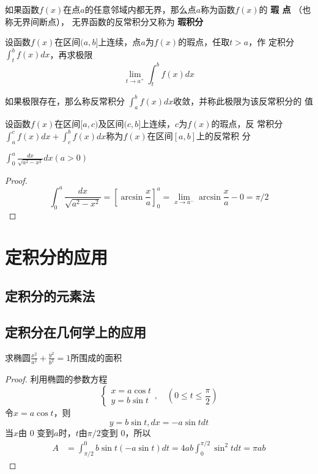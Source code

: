 \documentclass[11pt]{article}
\begin{document}
如果函数\(f(x)\)在点\(a\)的任意邻域内都无界，那么点\(a\)称为函数\(f(x)\)的 \textbf{瑕
点}  （也称无界间断点）， 无界函数的反常积分又称为 \textbf{瑕积分}

设函数\(f(x)\)在区间\((a,b]\)上连续，点\(a\)为\(f(x)\)的瑕点，任取\(t>a\)，作
定积分\(\int_t^bf(x)dx\)，再求极限
\begin{equation*}
\lim_{t\to a^+}\int^b_tf(x)dx
\end{equation*}

\begin{definition}[]
如果极限存在，那么称反常积分 \(\int_a^bf(x)dx\)收敛，并称此极限为该反常积分的
值
\end{definition}

设函数\(f(x)\)在区间\([a,c)\)及区间\((c,b]\)上连续，\(c\)为\(f(x)\)的瑕点，反
常积分\(\int_a^cf(x)dx+\int_c^bf(x)dx\)称为\(f(x)\)在区间\([a,b]\)上的反常积
分

\begin{proposition}[]
\(\int_0^a\frac{dx}{\sqrt{a^2-x^2}}dx(a>0)\)
\end{proposition}

\begin{proof}
\begin{equation*}
\int_0^a\frac{dx}{\sqrt{a^2-x^2}}=[\arcsin\frac{x}{a}]^a_0=\lim_{x\to a^-}
\arcsin \frac{x}{a}-0=\pi/2
\end{equation*}
\end{proof}
\section{定积分的应用}
\label{sec:orgf6f6a70}
\subsection{定积分的元素法}
\label{sec:orgb545e5d}
\subsection{定积分在几何学上的应用}
\label{sec:org914929a}
\begin{examplle}[]
求椭圆\(\frac{x^2}{a^2}+\frac{y^2}{b^2}=1\)所围成的面积
\end{examplle}

\begin{proof}
利用椭圆的参数方程
\begin{equation*}
\begin{cases}
x=a\cos t \\
y=b\sin t
\end{cases},\quad (0\le t\le\frac{\pi}{2})
\end{equation*}
令\(x=a\cos t\)，则
\begin{equation*}
y=b\sin t,dx=-a\sin t dt
\end{equation*}
当\(x\)由 0 变到\(a\)时，\(t\)由\(\pi/2\)变到 0，所以
\begin{align*}
A&=\int_{\pi/2}^0b\sin t(-a\sin t)dt=4ab\int_0^{\pi/2}\sin^2tdt=\pi ab
\end{align*}
\end{proof}
\end{document}
